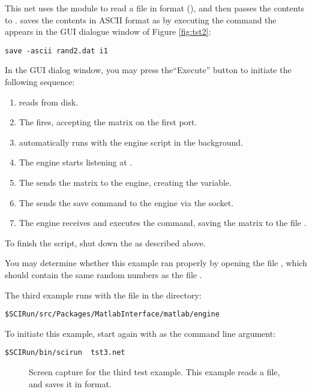 This net uses the  module to read a file in \sr{}
format (), and then passes the contents to \m{}.  \m{}
saves the contents in ASCII format as  by executing the
command the appears in the \mlm{} GUI dialogue window of Figure
\ref{fig:tst2}:
%
\begin{verbatim}
save -ascii rand2.dat i1
\end{verbatim} 

In the \mlm{} GUI dialog window, you may press the``Execute'' button to
initiate the following sequence:
%
\begin{enumerate}
  \item {} reads  from disk.
  \item The \mlm{} fires, accepting the matrix on the first port.
  \item \m{} automatically runs with the engine script in the background.
  \item The engine starts listening at .
  \item The \mlm{} sends the matrix to the engine, creating the 
        variable. 
  \item The \mlm{} sends the save command to the engine via the
        socket. 
  \item The engine receives and executes the command, saving the matrix to
        the file . 
\end{enumerate}

To finish the script, shut down the \mlm{} as described above.

You may determine whether this example ran properly by opening the file
, which should contain the same random numbers as the
file .


The third \mlm{} example runs with the  file in the
directory:
%
\begin{verbatim}
$SCIRun/src/Packages/MatlabInterface/matlab/engine
\end{verbatim}

To initiate this example, start \sr{} again with  
as the
command line argument:
%
\begin{verbatim}
$SCIRun/bin/scirun  tst3.net
\end{verbatim}

\begin{figure}[htb]
  \begin{makeimage}
  \end{makeimage}
  \tstthree
  \caption{\label{fig:tst3} Screen capture for the third test 
example. This
  example reads a \m{} file, and saves it in \sr{} format. }
\end{figure}


